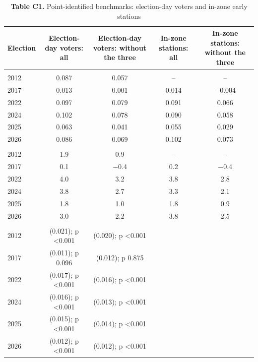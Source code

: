 \begin{table}[!htbp]
\centering
\footnotesize
\setlength{\tabcolsep}{3.5pt}
\caption*{\textbf{Table C1.} Point-identified benchmarks: election-day voters and in-zone early stations}
\begin{tabularx}{\linewidth}{lCCCC}
\toprule
Election & Election-day voters: all & Election-day voters: without the three & In-zone stations: all & In-zone stations: without the three \\
\midrule
\addlinespace[3pt] \\
2012 & 0.087 & 0.057 & -- & -- \\
2017 & 0.013 & 0.001 & 0.014 & $-$0.004 \\
2022 & 0.097 & 0.079 & 0.091 & 0.066 \\
2024 & 0.102 & 0.078 & 0.090 & 0.058 \\
2025 & 0.063 & 0.041 & 0.055 & 0.029 \\
2026 & 0.086 & 0.069 & 0.102 & 0.073 \\
\addlinespace[3pt] \\
2012 & 1.9 & 0.9 & -- & -- \\
2017 & 0.1 & $-$0.4 & 0.2 & $-$0.4 \\
2022 & 4.0 & 3.2 & 3.8 & 2.8 \\
2024 & 3.8 & 2.7 & 3.3 & 2.1 \\
2025 & 1.8 & 1.0 & 1.8 & 0.9 \\
2026 & 3.0 & 2.2 & 3.8 & 2.5 \\
\addlinespace[3pt] \\
2012 & (0.021); p <0.001 & (0.020); p <0.001 &  &  \\
2017 & (0.011); p 0.096 & (0.012); p 0.875 &  &  \\
2022 & (0.017); p <0.001 & (0.016); p <0.001 &  &  \\
2024 & (0.016); p <0.001 & (0.013); p <0.001 &  &  \\
2025 & (0.015); p <0.001 & (0.014); p <0.001 &  &  \\
2026 & (0.012); p <0.001 & (0.012); p <0.001 &  &  \\
\bottomrule
\end{tabularx}

\end{table}
